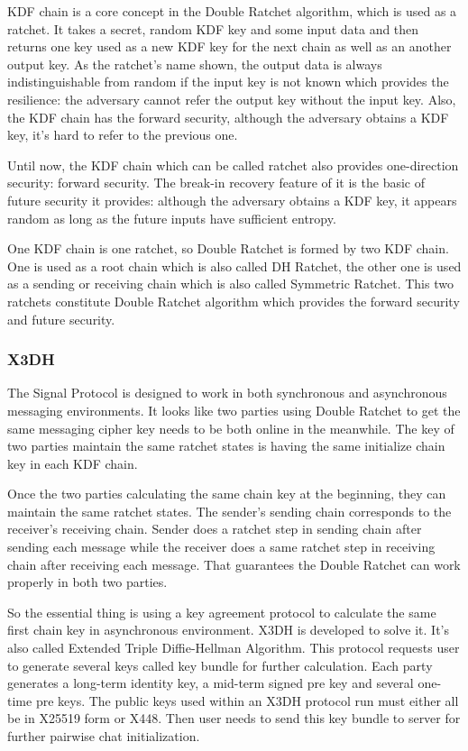 KDF chain is a core concept in the Double Ratchet algorithm, which is used as a ratchet. It takes a secret, random KDF key and some input data and then returns one key used as a new KDF key for the next chain as well as an another output key. As the ratchet's name shown, the output data is always indistinguishable from random if the input key is not known which provides the resilience: the adversary cannot refer the output key without the input key. Also, the KDF chain has the forward security, although the adversary obtains a KDF key, it's hard to refer to the previous one. 

Until now, the KDF chain which can be called ratchet also provides one-direction security: forward security. The break-in recovery feature of it is the basic of future security it provides: although the adversary obtains a KDF key, it appears random as long as the future inputs have sufficient entropy.

One KDF chain is one ratchet, so Double Ratchet is formed by two KDF chain. One is used as a root chain which is also called DH Ratchet, the other one is used as a sending or receiving chain which is also called Symmetric Ratchet. This two ratchets constitute Double Ratchet algorithm which provides the forward security and future security.

\subsubsection{X3DH}
The Signal Protocol is designed to work in both synchronous and asynchronous messaging environments. It looks like two parties using Double Ratchet to get the same messaging cipher key needs to be both online in the meanwhile. The key of two parties maintain the same ratchet states is having the same initialize chain key in each KDF chain.

Once the two parties calculating the same chain key at the beginning, they can maintain the same ratchet states. The sender's sending chain corresponds to the receiver's receiving chain. Sender does a ratchet step in sending chain after sending each message while the receiver does a same ratchet step in receiving chain after receiving each message. That guarantees the Double Ratchet can work properly in both two parties.

So the essential thing is using a key agreement protocol to calculate the same first chain key in asynchronous environment. X3DH is developed to solve it. It's also called Extended Triple Diffie-Hellman Algorithm. This protocol requests user to generate several keys called key bundle for further calculation. Each party generates a long-term identity key, a mid-term signed pre key and several one-time pre keys. The public keys used within an X3DH protocol run must either all be in X25519 form or X448.
Then user needs to send this key bundle to server for further pairwise chat initialization.

